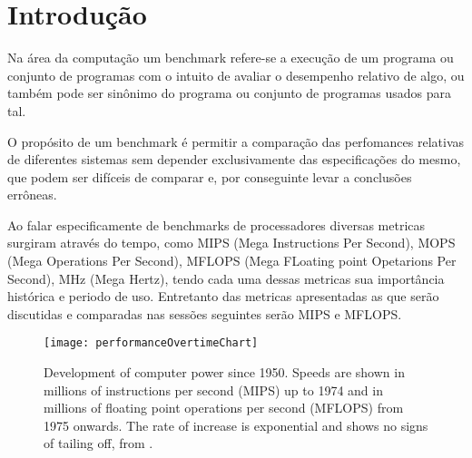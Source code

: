 
\section{Introdução}%
\label{sec:introduction}
Na área da computação um benchmark refere-se a execução de um programa ou conjunto de programas com o intuito de avaliar o desempenho relativo de algo, ou também pode ser sinônimo do programa ou conjunto de programas usados para tal.


O propósito de um benchmark é permitir a comparação das perfomances relativas de diferentes sistemas sem depender exclusivamente das especificações do mesmo, que podem ser difíceis de comparar e, por conseguinte levar a conclusões errôneas.

Ao falar especificamente de benchmarks de processadores diversas metricas surgiram através do tempo, como MIPS (Mega Instructions Per Second), MOPS (Mega Operations Per Second), MFLOPS (Mega FLoating point Opetarions Per Second), MHz (Mega Hertz), tendo cada uma dessas metricas sua importância histórica e periodo de uso. Entretanto das metricas apresentadas as que serão discutidas e comparadas nas sessões seguintes serão MIPS e MFLOPS.

\begin{figure}[H]
    \centering
    \texttt{[image: performanceOvertimeChart]}
    \caption{
        Development of computer power since 1950. Speeds are shown in millions of instructions per second (MIPS) up to 1974 and in millions of floating point operations per second (MFLOPS) from 1975 onwards. The rate of increase is exponential and shows no signs of tailing off, from \cite{mcguffie_henderson-sellers}.
    }
\end{figure}
 
